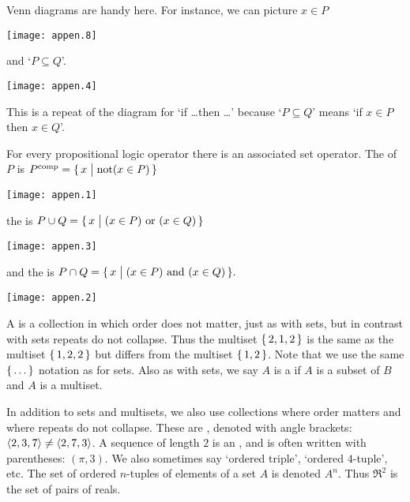 Venn diagrams are handy here.
For instance, we can picture \( x\in P \) 
\begin{center}
  \texttt{[image: appen.8]}
\end{center}
and `\( P\subseteq Q \)'.
\begin{center}
  \texttt{[image: appen.4]}
\end{center}
\noindent
This is a repeat of the diagram for `if \ldots then \ldots' 
because `\( P\subseteq Q \)' means 
`if \( x\in P \) then \( x\in Q \)'.

For every propositional logic operator there is an associated set
operator.
The 
of \( P \) is
\( P^{\text{comp}}=\mbox{$\{\,x\bigm| \text{not$( x\in P)$}\,\}$} \)
\begin{center}
  \texttt{[image: appen.1]}
\end{center}
\noindent
the  is
\( P\cup Q=\mbox{$\{\,x\bigm| \text{$(x\in P)$ or $(x\in Q)$}\,\}$} \)
\begin{center}
  \texttt{[image: appen.3]}
\end{center}
and the  is
\( P\cap Q=\mbox{$\{\,x\bigm| \text{$(x\in P)$ and $(x\in Q)$}\,\}$}. \)
\begin{center}
  \texttt{[image: appen.2]}
\end{center}


A 
is a collection in which order does not matter,
just as with sets,
but in contrast with sets repeats do not collapse.
Thus the multiset $\mbox{$\{\,2,1,2\,\}$}$ is the same as the multiset
$\mbox{$\{\,1,2,2\,\}$}$  but differs from the multiset
$\mbox{$\{\,1,2\,\}$}$. 
Note that we use the same $\mbox{$\{\,\ldots\,\}$}$ notation as for sets.
Also as with sets, we say $A$ is a  
if $A$ is a subset of $B$ and $A$ is a multiset.



In addition to sets and multisets,
we also use collections where order matters and where repeats do
not collapse.
These are , denoted with angle brackets:
\( \langle 2,3,7\rangle\neq\langle2,7,3\rangle \).
A sequence of length \( 2 \) is an 
,
and is often written with parentheses: \( (\pi,3) \).
We also sometimes say `ordered triple', `ordered \( 4 \)-tuple', etc.
The set of ordered \( n \)-tuples of elements of a set \( A \) is denoted
\( A^n \).
Thus \( \Re^2 \) is the set of pairs of reals.





